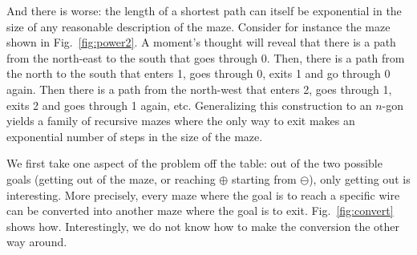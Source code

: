 \documentclass[a4paper,UKenglish,cleveref, autoref]{lipics-v2021}
\begin{document}
And there is worse: the length of a shortest path can itself be exponential in
the size of any reasonable description of the maze. Consider for instance the
maze shown in Fig.~\ref{fig:power2}. A moment's thought will reveal that there
is a path from the north-east to the south that goes through 0. Then, there is a
path from the north to the south that enters 1, goes through 0, exits 1 and go
through 0 again. Then there is a path from the north-west that enters 2, goes
through 1, exits 2 and goes through 1 again, etc. Generalizing this construction
to an $n$-gon yields a family of recursive mazes where the only way to exit
makes an exponential number of steps in the size of the maze.

We first take one aspect of the problem off the table: out of the two possible
goals (getting out of the maze, or reaching $\oplus$ starting from $\ominus$),
only getting out is interesting. More precisely, every maze where the goal is to
reach a specific wire can be converted into another maze where the goal is to
exit. Fig.~\ref{fig:convert} shows how. Interestingly, we do not know how to
make the conversion the other way around.
\end{document}
